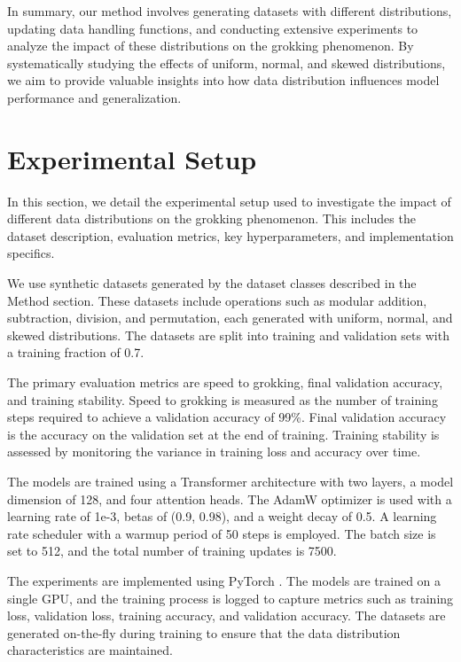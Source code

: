 \documentclass{article} %
\begin{document}
In summary, our method involves generating datasets with different distributions, updating data handling functions, and conducting extensive experiments to analyze the impact of these distributions on the grokking phenomenon. By systematically studying the effects of uniform, normal, and skewed distributions, we aim to provide valuable insights into how data distribution influences model performance and generalization.

\section{Experimental Setup}
\label{sec:experimental}

In this section, we detail the experimental setup used to investigate the impact of different data distributions on the grokking phenomenon. This includes the dataset description, evaluation metrics, key hyperparameters, and implementation specifics.

We use synthetic datasets generated by the dataset classes described in the Method section. These datasets include operations such as modular addition, subtraction, division, and permutation, each generated with uniform, normal, and skewed distributions. The datasets are split into training and validation sets with a training fraction of 0.7.

The primary evaluation metrics are speed to grokking, final validation accuracy, and training stability. Speed to grokking is measured as the number of training steps required to achieve a validation accuracy of 99\%. Final validation accuracy is the accuracy on the validation set at the end of training. Training stability is assessed by monitoring the variance in training loss and accuracy over time.

The models are trained using a Transformer architecture \cite{vaswani2017attention} with two layers, a model dimension of 128, and four attention heads. The AdamW optimizer \cite{loshchilov2017adamw} is used with a learning rate of 1e-3, betas of (0.9, 0.98), and a weight decay of 0.5. A learning rate scheduler with a warmup period of 50 steps is employed. The batch size is set to 512, and the total number of training updates is 7500.

The experiments are implemented using PyTorch \cite{paszke2019pytorch}. The models are trained on a single GPU, and the training process is logged to capture metrics such as training loss, validation loss, training accuracy, and validation accuracy. The datasets are generated on-the-fly during training to ensure that the data distribution characteristics are maintained.
\end{document}

